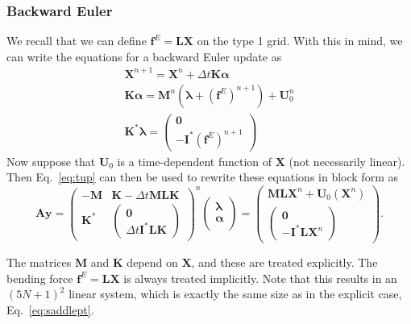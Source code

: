 \subsubsection{Backward Euler}
We recall that we can define $\bm{f}^E = \bm{L}\bm{X}$ on the type 1 grid. With this in mind, we can write the equations for a backward Euler update as
\begin{gather}
\label{eq:tup}
\bm{X}^{n+1} = \bm{X}^{n} + \Delta t  \bm{K} \bm{\alpha} \\[2 pt]
\label{eq:BEeqn}
\bm{K}\bm{\alpha}= \bm{M}^n\left(\bm{\lambda}+\left(\bm{f}^E\right)^{n+1}\right)+\bm{U}_0^{n}\\[2 pt]
\bm{K}^* \bm{\lambda}=\begin{pmatrix} \bm{0}\\[2 pt] -\bm{I}^*\left(\bm{f}^E\right)^{n+1}\end{pmatrix}
\end{gather}
Now suppose that $\bm{U}_0$ is a time-dependent function of $\bm{X}$ (not necessarily linear). Then Eq.\ \eqref{eq:tup} can then be used to rewrite these equations in block form as
\begin{equation}
\label{eq:impsolve}
\bm{A}\bm{y}=
    \begin{pmatrix}
    -\bm{M} &\bm{K}-\Delta t \bm{MLK} \\[4 pt]
   \bm{K}^* &\begin{pmatrix} \bm{0}\\[2 pt]\Delta t \bm{I}^*\bm{LK}\end{pmatrix} 
    \end{pmatrix}^n
    \begin{pmatrix} 
    \bm{\lambda}\\[4 pt]
    \bm{\alpha}\\[4 pt]
    \end{pmatrix} =  \begin{pmatrix} 
   \bm{ML}\bm{X}^n+\bm{U}_0(\bm{X}^n)\\[4 pt]
    \begin{pmatrix} \bm{0}\\[4 pt]
    -\bm{I}^*\bm{L}\bm{X}^n \end{pmatrix}
    \end{pmatrix}. 
\end{equation}

The matrices $\bm{M}$ and $\bm{K}$ depend on $\bm{X}$, and these are treated explicitly. The bending force $\bm{f}^E = \bm{L}\bm{X}$ is always treated implicitly. Note that this results in an $(5N+1)^2$ linear system, which is exactly the same size as in the explicit case, Eq.\ \eqref{eq:saddlept}. 

